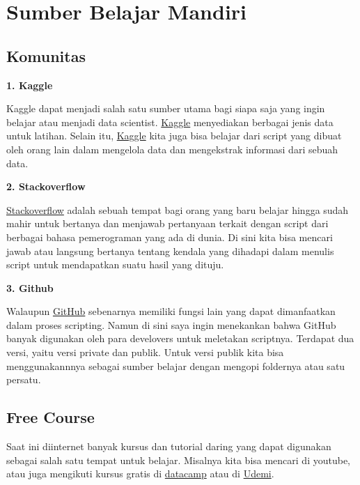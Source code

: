 \documentclass[]{book}
\begin{document}
\hypertarget{sumber-belajar-mandiri}{%
\chapter{Sumber Belajar Mandiri}\label{sumber-belajar-mandiri}}

\hypertarget{komunitas}{%
\section{Komunitas}\label{komunitas}}

\textbf{1. Kaggle}

Kaggle dapat menjadi salah satu sumber utama bagi siapa saja yang ingin
belajar atau menjadi data scientist.
\href{https://www.kaggle.com/}{Kaggle} menyediakan berbagai jenis data
untuk latihan. Selain itu, \href{https://www.kaggle.com/}{Kaggle} kita
juga bisa belajar dari script yang dibuat oleh orang lain dalam
mengelola data dan mengekstrak informasi dari sebuah data.

\textbf{2. Stackoverflow}

\href{https://stackoverflow.com/}{Stackoverflow} adalah sebuah tempat
bagi orang yang baru belajar hingga sudah mahir untuk bertanya dan
menjawab pertanyaan terkait dengan script dari berbagai bahasa
pemerograman yang ada di dunia. Di sini kita bisa mencari jawab atau
langsung bertanya tentang kendala yang dihadapi dalam menulis script
untuk mendapatkan suatu hasil yang dituju.

\textbf{3. Github}

Walaupun \href{https://github.com/}{GitHub} sebenarnya memiliki fungsi
lain yang dapat dimanfaatkan dalam proses scripting. Namun di sini saya
ingin menekankan bahwa GitHub banyak digunakan oleh para develovers
untuk meletakan scriptnya. Terdapat dua versi, yaitu versi private dan
publik. Untuk versi publik kita bisa menggunakannnya sebagai sumber
belajar dengan mengopi foldernya atau satu persatu.

\hypertarget{free-course}{%
\section{Free Course}\label{free-course}}

Saat ini diinternet banyak kursus dan tutorial daring yang dapat
digunakan sebagai salah satu tempat untuk belajar. Misalnya kita bisa
mencari di youtube, atau juga mengikuti kursus gratis di
\href{https://www.datacamp.com/}{datacamp} atau di
\href{https://www.udemy.com/courses/search/?src=ukw\&q=R}{Udemi}.


\end{document}
